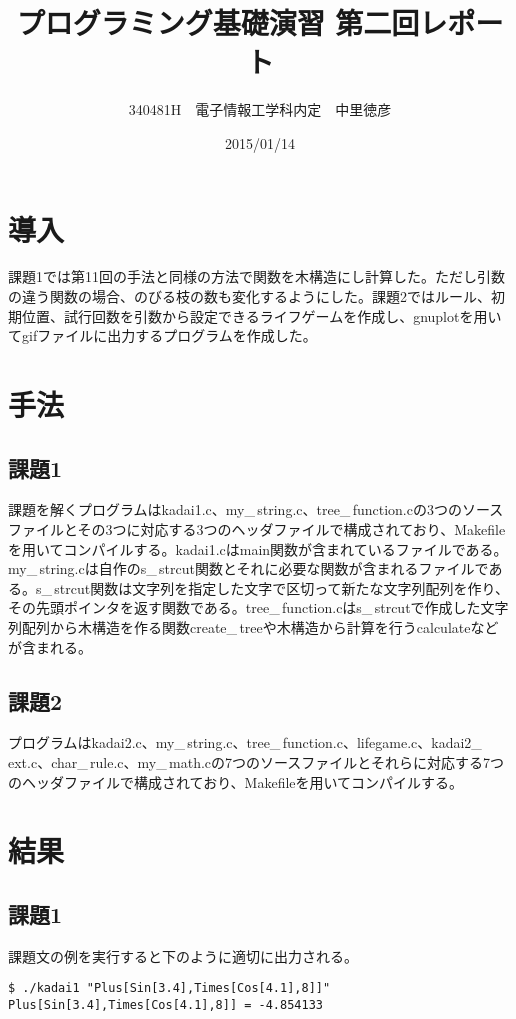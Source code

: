 \documentclass{jsarticle}
\title{プログラミング基礎演習 第二回レポート}
\author{340481H　電子情報工学科内定　中里徳彦}
\date{2015/01/14}
\begin{document}
\maketitle

\section{導入}
課題1では第11回の手法と同様の方法で関数を木構造にし計算した。ただし引数の違う関数の場合、のびる枝の数も変化するようにした。課題2ではルール、初期位置、試行回数を引数から設定できるライフゲームを作成し、gnuplotを用いてgifファイルに出力するプログラムを作成した。
\section{手法}
\subsection{課題1}
課題を解くプログラムはkadai1.c、my\_\,string.c、tree\_\,function.cの3つのソースファイルとその3つに対応する3つのヘッダファイルで構成されており、Makefileを用いてコンパイルする。kadai1.cはmain関数が含まれているファイルである。my\_\,string.cは自作のs\_\,strcut関数とそれに必要な関数が含まれるファイルである。s\_\,strcut関数は文字列を指定した文字で区切って新たな文字列配列を作り、その先頭ポインタを返す関数である。tree\_\,function.cはs\_\,strcutで作成した文字列配列から木構造を作る関数create\_\,treeや木構造から計算を行うcalculateなどが含まれる。

\subsection{課題2}
プログラムはkadai2.c、my\_\,string.c、tree\_\,function.c、lifegame.c、kadai2\_\,ext.c、char\_\,rule.c、my\_\,math.cの7つのソースファイルとそれらに対応する7つのヘッダファイルで構成されており、Makefileを用いてコンパイルする。
\section{結果}
\subsection{課題1}
課題文の例を実行すると下のように適切に出力される。
\begin{verbatim}
$ ./kadai1 "Plus[Sin[3.4],Times[Cos[4.1],8]]"                                                                                     
Plus[Sin[3.4],Times[Cos[4.1],8]] = -4.854133
\end{verbatim}
\end{document}
